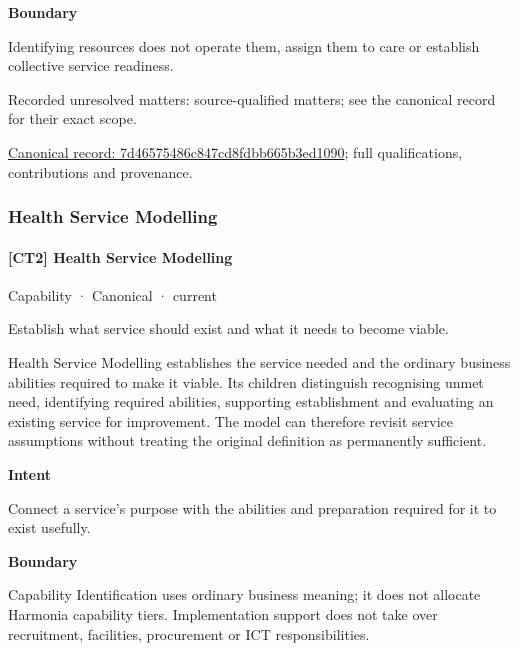 \textbf{Boundary}



Identifying resources does not operate them, assign them to care or establish collective service readiness.


{\small Recorded unresolved matters: source-qualified matters; see the canonical record for their exact scope.}\par
{\footnotesize \href{../../../../continuum/strategy/capability/7d46575486c847cd8fdbb665b3ed1090.md}{Canonical record: 7d46575486c847cd8fdbb665b3ed1090}; full qualifications, contributions and provenance.}\par
\subsubsection{Health Service Modelling}

\paragraph{[CT2] Health Service Modelling}

\label{element:9a3e90db97b94d1888a2a5c5effb8999}
{\small Capability · Canonical · current}\par

Establish what service should exist and what it needs to become viable.



Health Service Modelling establishes the service needed and the ordinary business abilities required to make it viable. Its children distinguish recognising unmet need, identifying required abilities, supporting establishment and evaluating an existing service for improvement. The model can therefore revisit service assumptions without treating the original definition as permanently sufficient.



\textbf{Intent}



Connect a service's purpose with the abilities and preparation required for it to exist usefully.



\textbf{Boundary}



Capability Identification uses ordinary business meaning; it does not allocate Harmonia capability tiers. Implementation support does not take over recruitment, facilities, procurement or ICT responsibilities.


